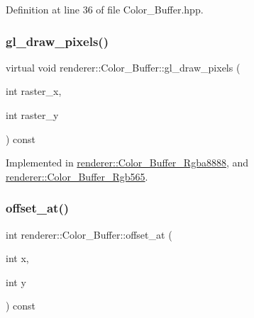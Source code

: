 Definition at line 36 of file Color\+\_\+\+Buffer.\+hpp.

\mbox{\label{classrenderer_1_1_color___buffer_a1108142247a2814d028b5ffbcde72d52}} 
\subsubsection{\texorpdfstring{gl\_draw\_pixels()}{gl\_draw\_pixels()}}
{\footnotesize\ttfamily virtual void renderer\+::\+Color\+\_\+\+Buffer\+::gl\+\_\+draw\+\_\+pixels (\begin{DoxyParamCaption}\item[{int}]{raster\+\_\+x,  }\item[{int}]{raster\+\_\+y }\end{DoxyParamCaption}) const\hspace{0.3cm}{\ttfamily [pure virtual]}}



Implemented in \mbox{\hyperlink{classrenderer_1_1_color___buffer___rgba8888_afef366739856f8d429cee6ced277d167}{renderer\+::\+Color\+\_\+\+Buffer\+\_\+\+Rgba8888}}, and \mbox{\hyperlink{classrenderer_1_1_color___buffer___rgb565_a8e9e5e0646c4ac90e4867e8f83352eaa}{renderer\+::\+Color\+\_\+\+Buffer\+\_\+\+Rgb565}}.

\mbox{\label{classrenderer_1_1_color___buffer_a899ad44fd4d44ffed9e0704f97e01daf}} 
\subsubsection{\texorpdfstring{offset\_at()}{offset\_at()}}
{\footnotesize\ttfamily int renderer\+::\+Color\+\_\+\+Buffer\+::offset\+\_\+at (\begin{DoxyParamCaption}\item[{int}]{x,  }\item[{int}]{y }\end{DoxyParamCaption}) const\hspace{0.3cm}{\ttfamily [inline]}}



